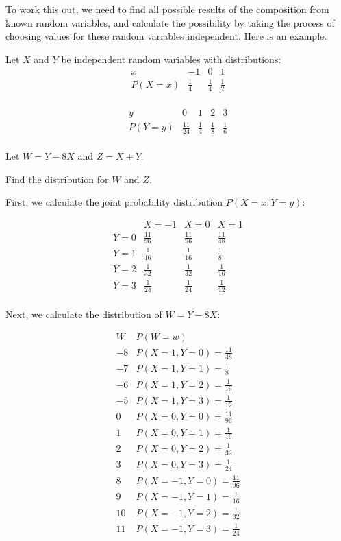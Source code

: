 To work this out, we need to find all possible results of the composition from known random variables, and calculate the possibility by taking the process of choosing values for these random variables independent. Here is an example.

\begin{example}
Let \(X\) and \(Y\) be independent random variables with distributions:
\[
\begin{array}{c|ccc}
x & -1 & 0 & 1 \\
\hline
P(X = x) & \frac{1}{4} & \frac{1}{4} & \frac{1}{2} \\
\end{array}
\]

\[
\begin{array}{c|cccc}
y & 0 & 1 & 2 & 3 \\
\hline
P(Y = y) & \frac{11}{24} & \frac{1}{4} & \frac{1}{8} & \frac{1}{6} \\
\end{array}
\]

Let \(W = Y - 8X\) and \(Z = X + Y\).

Find the distribution for $W$ and $Z$.
\begin{solution}
    First, we calculate the joint probability distribution \(P(X = x, Y = y)\):

\[
\begin{array}{c|ccc}
 & X = -1 & X = 0 & X = 1 \\
\hline
Y = 0 & \frac{11}{96} & \frac{11}{96} & \frac{11}{48} \\
Y = 1 & \frac{1}{16} & \frac{1}{16} & \frac{1}{8} \\
Y = 2 & \frac{1}{32} & \frac{1}{32} & \frac{1}{16} \\
Y = 3 & \frac{1}{24} & \frac{1}{24} & \frac{1}{12} \\
\end{array}
\]

Next, we calculate the distribution of \(W = Y - 8X\):

\[
\begin{array}{c|c}
W & P(W = w) \\
\hline
-8 & P(X = 1, Y = 0) = \frac{11}{48} \\
-7 & P(X = 1, Y = 1) = \frac{1}{8} \\
-6 & P(X = 1, Y = 2) = \frac{1}{16} \\
-5 & P(X = 1, Y = 3) = \frac{1}{12} \\
0 & P(X = 0, Y = 0) = \frac{11}{96} \\
1 & P(X = 0, Y = 1) = \frac{1}{16} \\
2 & P(X = 0, Y = 2) = \frac{1}{32} \\
3 & P(X = 0, Y = 3) = \frac{1}{24} \\
8 & P(X = -1, Y = 0) = \frac{11}{96} \\
9 & P(X = -1, Y = 1) = \frac{1}{16} \\
10 & P(X = -1, Y = 2) = \frac{1}{32} \\
11 & P(X = -1, Y = 3) = \frac{1}{24} \\
\end{array}
\]


\end{solution}
\end{example}
